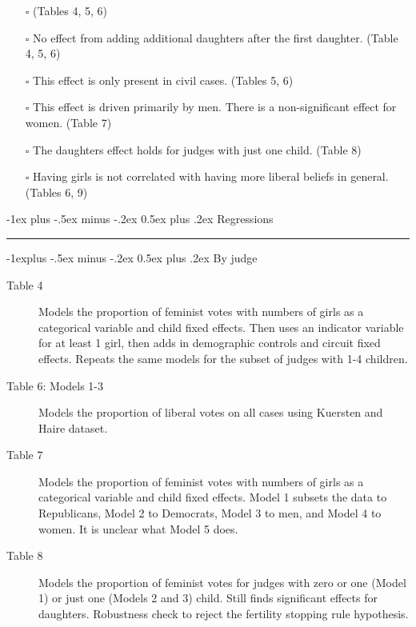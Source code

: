 \documentclass[10pt,landscape]{article}
\makeatletter
\renewcommand{\section}{\@startsection{section}{1}{0mm}%
                                {-1ex plus -.5ex minus -.2ex}%
                                {0.5ex plus .2ex}%
                                {\normalfont\Large\bfseries}}
\renewcommand{\subsection}{\@startsection{subsection}{2}{0mm}%
                                {-1explus -.5ex minus -.2ex}%
                                {0.5ex plus .2ex}%
                                {\normalfont\Large\bfseries}}
\makeatother
\begin{document}
\begin{multicols*}{2}
\begin{itemize}
        \item[$\square$]  (Tables 4, 5, 6)
        
        \item[$\square$] No effect from adding additional daughters after the first daughter. (Table 4, 5, 6)
        
        \item[$\square$] This effect is only present in civil cases. (Tables 5, 6)
        
        \item[$\square$] This effect is driven primarily by men. There is a non-significant effect for women. (Table 7)
        
        \item[$\square$] The daughters effect holds for judges with just one child. (Table 8)
        
        \item[$\square$] Having girls is not correlated with having more liberal beliefs in general. (Tables 6, 9)
   
   \end{itemize}

\section{Regressions} \smallskip \hrule height 2pt \smallskip

   \small
   \subsection{By judge}
   \begin{description}
         \item[Table 4] Models the proportion of feminist votes with numbers of girls as a categorical variable and child fixed effects. Then uses an indicator variable for at least 1 girl, then adds in demographic controls and circuit fixed effects. Repeats the same models for the subset of judges with 1-4 children.
         \item[Table 6: Models 1-3] Models the proportion of liberal votes on all cases using Kuersten and Haire dataset.
         \item[Table 7] Models the proportion of feminist votes with numbers of girls as a categorical variable and child fixed effects. Model 1 subsets the data to Republicans, Model 2 to Democrats, Model 3 to men, and Model 4 to women. It is unclear what Model 5 does.
         \item[Table 8] Models the proportion of feminist votes for judges with zero or one (Model 1) or just one (Models 2 and 3) child. Still finds significant effects for daughters. Robustness check to reject the fertility stopping rule hypothesis.
   \end{description}
   

\end{multicols*}
\end{document}
